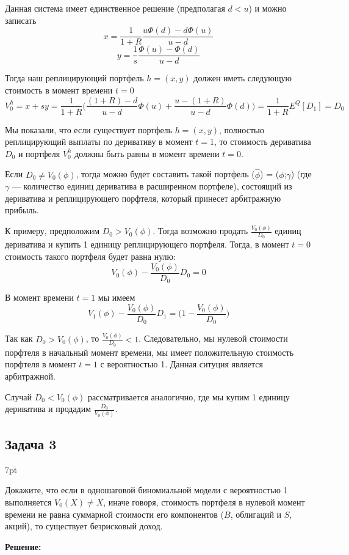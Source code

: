 \documentclass[a4paper,12pt]{article}
\newenvironment{formal}{%
	\def\FrameCommand{%
		\hspace{1pt}%
		{\color{black}\vrule width 1.5pt}%
		{\color{white}\vrule width 4pt}%
		\colorbox{white}%
	}%
	\MakeFramed{\advance\hsize-\width\FrameRestore}%
	\noindent\hspace{-4.55pt}%
	\begin{adjustwidth}{}{7pt}%
		\vspace{2pt}\vspace{2pt}%
	}
	{%
		\vspace{2pt}\end{adjustwidth}\endMakeFramed%
}
\begin{document}
Данная система имеет единственное решение (предполагая $d<u$) и можно записать
\begin{equation*}
	x = \frac{1}{1+R} \frac{u\Phi(d)-d\Phi(u)}{u-d}
\end{equation*}
\begin{equation*}
	y = \frac{1}{s} \frac{\Phi(u)-\Phi(d)}{u-d}
\end{equation*}

Тогда наш реплицирующий портфель $h=(x,y)$ должен иметь следующую стоимость в момент времени $t=0$
\begin{equation*}
	V_0^h = x+sy = \frac{1}{1+R} \bigg( \frac{(1+R) - d}{u-d} \Phi(u) + \frac{u - (1+R)}{u-d} \Phi(d) \bigg) = \frac{1}{1+R} E^Q [D_1] = D_0
\end{equation*}

Мы показали, что если существует портфель $h = (x,y)$, полностью реплицирующий выплаты по деривативу в момент $t=1$, то стоимость дериватива $D_0$ и портфеля $V_0^h$ должны быть равны в момент времени $t=0$.

Если $D_0 \neq V_0(\phi)$, тогда можно будет составить такой портфель ($\hat{\phi}$) = ($\phi$;$\gamma$) (где $\gamma$ — количество единиц дериватива в расширенном портфеле), состоящий из дериватива и реплицирующего порфтеля, который принесет арбитражную прибыль.

К примеру, предположим $D_0 > V_0(\phi)$. Тогда возможно продать $\frac{V_0(\phi)}{D_0}$ единиц дериватива и купить 1 единицу реплицирующего портфеля. Тогда, в момент $t=0$ стоимость такого портфеля будет равна нулю:
\begin{equation}
	V_0(\phi) - \frac{V_0(\phi)}{D_0} D_0 = 0
\end{equation}

В момент времени $t=1$ мы имеем 
\begin{equation}
	V_1(\phi) - \frac{V_0(\phi)}{D_0} D_1 = \Big( 1 - \frac{V_0(\phi)}{D_0} \Big)
\end{equation}

Так как $D_0 > V_0(\phi)$, то $\frac{V_0(\phi)}{D_0} < 1$. Следовательно, мы нулевой стоимости порфтеля в начальный момент времени, мы имеет положительную стоимость порфтеля в момент $t=1$ с вероятностью 1. Данная ситуция является арбитражной. 

Случай $D_0 < V_0(\phi)$ рассматривается аналогично, где мы купим 1 единицу дериватива и продадим $\frac{D_0}{V_0(\phi)}$.


\subsection*{Задача 3}
\begin{formal}
Докажите, что если в одношаговой биномиальной модели с вероятностью 1 выполняется $V_0(X) \neq X$, иначе говоря, стоимость портфеля в нулевой момент времени не равна суммарной стоимости его компонентов ($B$, облигаций и $S$, акций), то существует безрисковый доход.

\end{formal}
\textbf{\large Решение:}
\end{document}
